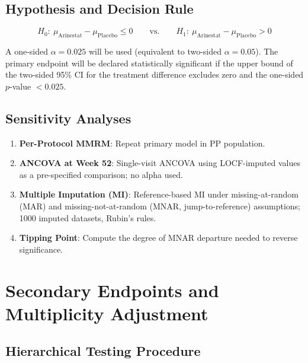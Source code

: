 \documentclass[11pt,a4paper]{article}
\begin{document}
\subsection{Hypothesis and Decision Rule}

\[
  H_0{:}\ \mu_{\text{Arinestat}} - \mu_{\text{Placebo}} \leq 0
  \qquad\text{vs.}\qquad
  H_1{:}\ \mu_{\text{Arinestat}} - \mu_{\text{Placebo}} > 0
\]

A one-sided $\alpha = 0.025$ will be used (equivalent to two-sided $\alpha = 0.05$).
The primary endpoint will be declared statistically significant if the upper bound of
the two-sided 95\% CI for the treatment difference excludes zero and the one-sided
$p$-value $< 0.025$.

\subsection{Sensitivity Analyses}

\begin{enumerate}[leftmargin=1.8em, label=\textbf{S\arabic*.}, itemsep=4pt]
  \item \textbf{Per-Protocol MMRM}: Repeat primary model in PP population.
  \item \textbf{ANCOVA at Week 52}: Single-visit ANCOVA using LOCF-imputed values as a
        pre-specified comparison; no alpha used.
  \item \textbf{Multiple Imputation (MI)}: Reference-based MI under missing-at-random (MAR)
        and missing-not-at-random (MNAR, jump-to-reference) assumptions; 1000 imputed
        datasets, Rubin's rules.
  \item \textbf{Tipping Point}: Compute the degree of MNAR departure needed to reverse
        significance.
\end{enumerate}

\clearpage

\section{Secondary Endpoints and Multiplicity Adjustment}

\subsection{Hierarchical Testing Procedure}
\end{document}

